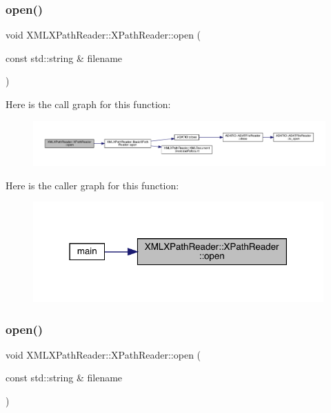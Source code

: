 \subsubsection{\texorpdfstring{open()}{open()}\hspace{0.1cm}{\footnotesize\ttfamily [2/9]}}
{\footnotesize\ttfamily void X\+M\+L\+X\+Path\+Reader\+::\+X\+Path\+Reader\+::open (\begin{DoxyParamCaption}\item[{const std\+::string \&}]{filename }\end{DoxyParamCaption})\hspace{0.3cm}{\ttfamily [inline]}}

Here is the call graph for this function\+:
\nopagebreak
\begin{figure}[H]
\begin{center}
\leavevmode
\includegraphics[width=350pt]{d3/d5a/classXMLXPathReader_1_1XPathReader_aa6e237582bcd20389d60cb29a879890c_cgraph}
\end{center}
\end{figure}
Here is the caller graph for this function\+:
\nopagebreak
\begin{figure}[H]
\begin{center}
\leavevmode
\includegraphics[width=316pt]{d3/d5a/classXMLXPathReader_1_1XPathReader_aa6e237582bcd20389d60cb29a879890c_icgraph}
\end{center}
\end{figure}
\mbox{\label{classXMLXPathReader_1_1XPathReader_aa6e237582bcd20389d60cb29a879890c}} 
\subsubsection{\texorpdfstring{open()}{open()}\hspace{0.1cm}{\footnotesize\ttfamily [3/9]}}
{\footnotesize\ttfamily void X\+M\+L\+X\+Path\+Reader\+::\+X\+Path\+Reader\+::open (\begin{DoxyParamCaption}\item[{const std\+::string \&}]{filename }\end{DoxyParamCaption})\hspace{0.3cm}{\ttfamily [inline]}}

